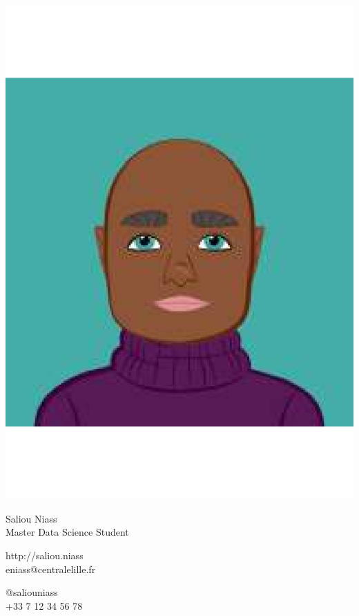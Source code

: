 \documentclass{article}
\begin{document}
\centering \includegraphics[width=.25\linewidth]{logo}\\[5pt]
\parbox{2in}{\Large \centering Saliou Niass\\[1pt]
\normalsize Master Data Science Student}

\vfill
\raggedright
\begin{multicols}{2}
http://saliou.niass\\
eniass@centralelille.fr

\columnbreak
\raggedleft
@saliouniass\\
+33 7 12 34 56 78%
\end{multicols}%
\end{document}
